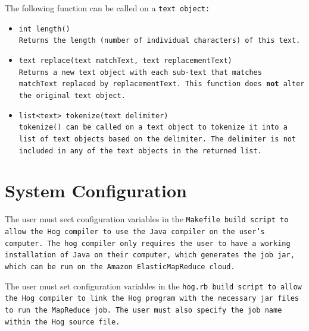 \documentclass{report}
\begin{document}
The following function can be called on a \tt text \rm object:

\begin{itemize}

\item[] \tt int length() \rm \\

Returns the length (number of individual characters) of this \tt text\rm.

\item[] \tt text replace(text matchText, text replacementText) \rm \\

Returns a new \tt text \rm object with each sub-\tt text \rm that matches \tt
matchText \rm replaced by \tt replacementText\rm. This function does \textbf{not}
alter the original \tt text \rm object.

\item[] \tt list<text> tokenize(text delimiter) \rm \\

\tt tokenize() \rm can be called on a \tt text \rm object to tokenize it into a
list of \tt text \rm objects based on the delimiter. The delimiter is not included
in any of the \tt text \rm objects in the returned list.

\end{itemize}




\section{System Configuration} %
\label{sec:system_configuration}

The user must sect configuration variables in the \tt Makefile \rm build script to allow the Hog
compiler to use the Java compiler on the user's computer. The hog compiler only requires the user to have
a working installation of Java on their computer, which generates the job jar, which can be run on the Amazon
ElasticMapReduce cloud.

The user must set configuration variables in the \tt hog.rb \rm build script to
allow the Hog compiler to link the Hog program with the necessary jar files to run
the MapReduce job. The user must also specify the job name within the Hog source
file.
\end{document}
